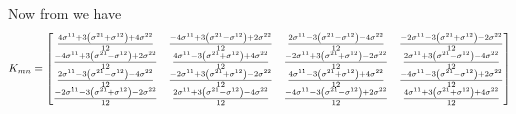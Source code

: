 Now from  we have
\begin{equation}
  K_{mn}=\begin{bmatrix}
  \frac{4 \sigma ^{11}+3\left(  \sigma ^{21}+
       \sigma ^{12} \right)+4 \sigma ^{22}}{12} &
  \frac{-4 \sigma ^{11}+3\left(  \sigma ^{21}-
       \sigma ^{12} \right)+2 \sigma ^{22}}{12} &
  \frac{2 \sigma ^{11}-3\left(  \sigma ^{21}-
       \sigma ^{12} \right)-4 \sigma ^{22}}{12} &
  \frac{-2 \sigma ^{11}-3\left(  \sigma ^{21}+
         \sigma ^{12} \right)-2 \sigma ^{22}}{12} \\
  \frac{-4 \sigma ^{11}+3\left(  \sigma ^{21}-
       \sigma ^{12} \right)+2 \sigma ^{22}}{12} &
  \frac{4 \sigma ^{11}-3\left(  \sigma ^{21}+
       \sigma ^{12} \right)+4 \sigma ^{22}}{12} &
  \frac{-2 \sigma ^{11}+3\left(  \sigma ^{21}+
         \sigma ^{12} \right)-2 \sigma ^{22}}{12} &
  \frac{2 \sigma ^{11}+3\left(  \sigma ^{21}-
         \sigma ^{12} \right)-4 \sigma ^{22}}{12} \\
  \frac{2 \sigma ^{11}-3\left(  \sigma ^{21}-
       \sigma ^{12} \right)-4 \sigma ^{22}}{12} &
  \frac{-2 \sigma ^{11}+3\left(  \sigma ^{21}+
         \sigma ^{12} \right)-2 \sigma ^{22}}{12} &
  \frac{4 \sigma ^{11}-3\left(  \sigma ^{21}+
       \sigma ^{12} \right)+4 \sigma ^{22}}{12} &
  \frac{-4 \sigma ^{11}-3\left(  \sigma ^{21}-
       \sigma ^{12} \right)+2 \sigma ^{22}}{12} \\
  \frac{-2 \sigma ^{11}-3\left(  \sigma ^{21}+
         \sigma ^{12} \right)-2 \sigma ^{22}}{12} &
  \frac{2 \sigma ^{11}+3\left(  \sigma ^{21}-
         \sigma ^{12} \right)-4 \sigma ^{22}}{12}&
  \frac{-4 \sigma ^{11}-3\left(  \sigma ^{21}-
       \sigma ^{12} \right)+2 \sigma ^{22}}{12} &
  \frac{4 \sigma ^{11}+3\left(  \sigma ^{21}+
       \sigma ^{12} \right)+4 \sigma ^{22}}{12}
  \end{bmatrix}
\end{equation}

